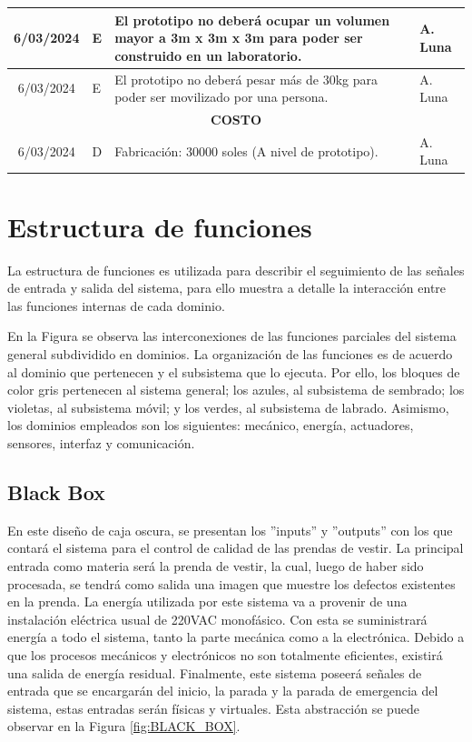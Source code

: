 \begin{longtable}{|c|p{4.5em}|p{22.5em}|p{6em}|}
	\hline
	6/03/2024 & E     & El prototipo no deberá ocupar un volumen mayor a 3m x 3m x 3m para poder ser construido en un laboratorio. & A. Luna \bigstrut\\
	\hline
	6/03/2024 & E     & El prototipo no deberá pesar más de 30kg para poder ser movilizado por una persona. & A. Luna \bigstrut\\
	\hline
	\multicolumn{4}{|p{37.5em}|}{\textbf{COSTO}} \bigstrut\\
	\hline
	6/03/2024 & D     & Fabricación: 30000 soles (A nivel de prototipo). & A. Luna \bigstrut\\
	\hline
\end{longtable}%


\section{Estructura de funciones}

La estructura de funciones es utilizada para describir el seguimiento de las señales de entrada y salida del sistema, para ello muestra a detalle la interacción entre las funciones internas de cada dominio.

En la Figura se observa las interconexiones de las funciones parciales del sistema general subdividido en dominios. La organización de las funciones es de acuerdo al dominio que pertenecen y el subsistema que lo ejecuta. Por ello, los bloques de color gris pertenecen al sistema general; los azules, al subsistema de sembrado; los violetas, al subsistema móvil; y los verdes, al subsistema de labrado. Asimismo, los dominios empleados son los siguientes: mecánico, energía, actuadores, sensores, interfaz y comunicación.

\subsection{Black Box}

En este diseño de caja oscura, se presentan los ''inputs'' y ''outputs'' con los que contará el sistema para el control de calidad de las prendas de vestir. La principal entrada como materia será la prenda de vestir, la cual, luego de haber sido procesada, se tendrá como salida una imagen que muestre los defectos existentes en la prenda. La energía utilizada por este sistema va a provenir de una instalación eléctrica usual de 220VAC monofásico. Con esta se suministrará energía a todo el sistema, tanto la parte mecánica como a la electrónica. Debido a que los procesos mecánicos y electrónicos no son totalmente eficientes, existirá una salida de energía residual. Finalmente, este sistema poseerá señales de entrada que se encargarán del inicio, la parada y la parada de emergencia del sistema, estas entradas serán físicas y virtuales. Esta abstracción se puede observar en la Figura \ref{fig:BLACK_BOX}.

